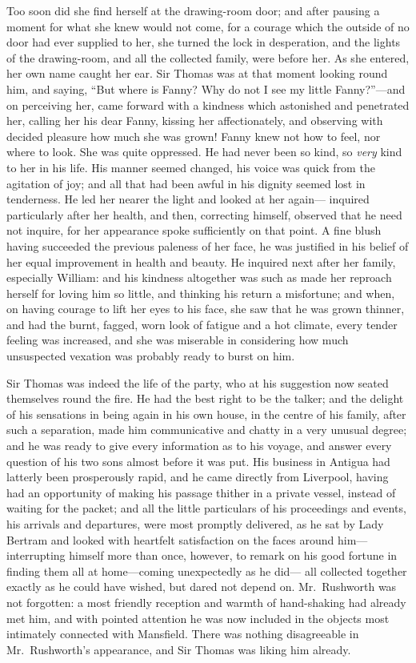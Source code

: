 Too soon did she find herself at the drawing-room door;
and after pausing a moment for what she knew would not come,
for a courage which the outside of no door had ever supplied
to her, she turned the lock in desperation, and the lights
of the drawing-room, and all the collected family,
were before her.  As she entered, her own name caught
her ear.  Sir Thomas was at that moment looking round him,
and saying, ``But where is Fanny?  Why do not I see
my little Fanny?''---and on perceiving her, came forward
with a kindness which astonished and penetrated her,
calling her his dear Fanny, kissing her affectionately,
and observing with decided pleasure how much she was grown!
Fanny knew not how to feel, nor where to look.  She was
quite oppressed.  He had never been so kind, so \emph{very}
kind to her in his life.  His manner seemed changed,
his voice was quick from the agitation of joy; and all that
had been awful in his dignity seemed lost in tenderness.
He led her nearer the light and looked at her again---%
inquired particularly after her health, and then,
correcting himself, observed that he need not inquire,
for her appearance spoke sufficiently on that point.  A fine
blush having succeeded the previous paleness of her face,
he was justified in his belief of her equal improvement
in health and beauty.  He inquired next after her family,
especially William:  and his kindness altogether was such
as made her reproach herself for loving him so little,
and thinking his return a misfortune; and when, on having
courage to lift her eyes to his face, she saw that he
was grown thinner, and had the burnt, fagged, worn look
of fatigue and a hot climate, every tender feeling
was increased, and she was miserable in considering
how much unsuspected vexation was probably ready to burst
on him.

Sir Thomas was indeed the life of the party, who at
his suggestion now seated themselves round the fire.
He had the best right to be the talker; and the delight
of his sensations in being again in his own house,
in the centre of his family, after such a separation,
made him communicative and chatty in a very unusual degree;
and he was ready to give every information as to his voyage,
and answer every question of his two sons almost before
it was put.  His business in Antigua had latterly been
prosperously rapid, and he came directly from Liverpool,
having had an opportunity of making his passage thither
in a private vessel, instead of waiting for the packet;
and all the little particulars of his proceedings and events,
his arrivals and departures, were most promptly delivered,
as he sat by Lady Bertram and looked with heartfelt
satisfaction on the faces around him---interrupting himself
more than once, however, to remark on his good fortune
in finding them all at home---coming unexpectedly as he did---%
all collected together exactly as he could have wished,
but dared not depend on.  Mr.\ Rushworth was not forgotten:
a most friendly reception and warmth of hand-shaking
had already met him, and with pointed attention he was
now included in the objects most intimately connected
with Mansfield.  There was nothing disagreeable in
Mr.\ Rushworth's appearance, and Sir Thomas was liking
him already.

